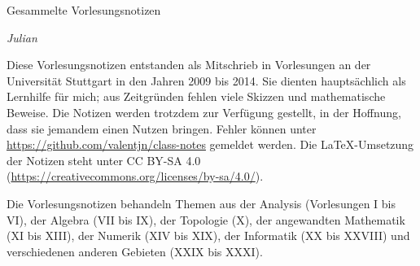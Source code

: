 
\ihead{\leftmark}
\ifoot{\vspace{-1.5mm}\rightmark}

\thispagestyle{empty}
\vspace*{1em}

{%
  \huge%
  Gesammelte Vorlesungsnotizen%
}
\vspace*{1em}

\emph{Julian }

\vspace*{1em}

Diese Vorlesungsnotizen entstanden als Mitschrieb in Vorlesungen
an der Universität Stuttgart in den Jahren 2009 bis 2014.
Sie dienten hauptsächlich als Lernhilfe für mich;
aus Zeitgründen fehlen viele Skizzen und mathematische Beweise.
Die Notizen werden trotzdem zur Verfügung gestellt, in der Hoffnung,
dass sie jemandem einen Nutzen bringen.
Fehler können unter \url{https://github.com/valentjn/class-notes} gemeldet werden.
Die \LaTeX{}-Umsetzung der Notizen steht unter CC BY-SA 4.0
(\url{https://creativecommons.org/licenses/by-sa/4.0/}).

Die Vorlesungsnotizen behandeln Themen aus
der Analysis (Vorlesungen I bis VI),
der Algebra (VII bis IX),
der Topologie (X),
der angewandten Mathematik (XI bis XIII),
der Numerik (XIV bis XIX),
der Informatik (XX bis XXVIII) und
verschiedenen anderen Gebieten (XXIX bis XXXI).

{%
  \setcounter{tocdepth}{\parttocdepth}


  \renewcommand*{\contentsname}{Vorlesungen}
  \tableofcontents%
}

\pagebreak

{%

  \setcounter{tocdepth}{\subsubsectiontocdepth}

  \tableofcontents%
}

\pagebreak



